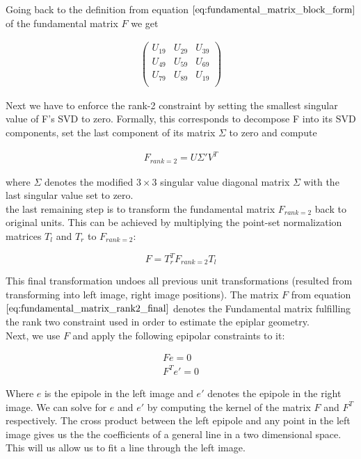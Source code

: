 \documentclass{paper}
\begin{document}
Going back to the definition from equation $\ref{eq:fundamental_matrix_block_form}$ of the fundamental matrix $F$ we get

\begin{align}
\left(\begin{array}{ccc}
U_{19} & U_{29} & U_{39} \\
U_{49} & U_{59} & U_{69} \\
U_{79} & U_{89} & U_{19} \\
\end{array} \right)
\end{align}


Next we have to enforce the rank-2 constraint by setting the smallest singular value of F's SVD to zero. Formally, this corresponds to decompose F into its SVD components, set the last component of its matrix $\Sigma$ to zero and compute 

\begin{align}
    F_{rank=2} = U \Sigma' V^{T}
\end{align}

where $\Sigma$ denotes the modified $3 \times 3$ singular value diagonal matrix $\Sigma$ with the last singular value set to zero. \\

the last remaining step is to transform the fundamental matrix $F_{rank=2}$ back to original units. This can be achieved by multiplying the point-set normalization matrices $T_l$ and $T_r$ to $F_{rank=2}$:

\begin{equation}
    F = T_{r}^{T} F_{rank=2} T_{l} 
\label{eq:fundamental_matrix_rank2_final}
\end{equation}

This final transformation undoes all previous unit transformations (resulted from transforming into left image, right image positions). The matrix $F$ from equation $\ref{eq:fundamental_matrix_rank2_final}$ denotes the Fundamental matrix fulfilling the rank two constraint used in order to estimate the epiplar geometry. \\

Next, we use $F$ and apply the following epipolar constraints to it:

\begin{align*}
F e = 0 \\
F^{T} e' = 0 
\end{align*}

Where $e$ is the epipole in the left image and $e'$ denotes the epipole in the right image. We can solve for $e$ and $e'$ by computing the kernel of the matrix $F$ and $F^{T}$ respectively. The cross product between the left epipole and any point in the left image gives us the the coefficients of a general line in a two dimensional space. This will us allow us to fit a line through the left image. \\
\end{document}
